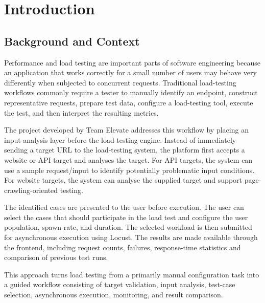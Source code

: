 \documentclass{tietreport}
\author{%
  \texttt{102403671} Yash Bharadwaj \\
  \texttt{1024030672} Nikhil Khosla \\
  \texttt{1024031155} Krish Agrawal%
}
\begin{document}
\maketitle

\tableofcontents


\chapter{Introduction}

\section{Background and Context}

Performance and load testing are important parts of software engineering because an application that works correctly for a small number of users may behave very differently when subjected to concurrent requests. Traditional load-testing workflows commonly require a tester to manually identify an endpoint, construct representative requests, prepare test data, configure a load-testing tool, execute the test, and then interpret the resulting metrics.

The project developed by Team Elevate addresses this workflow by placing an input-analysis layer before the load-testing engine. Instead of immediately sending a target URL to the load-testing system, the platform first accepts a website or API target and analyses the target. For API targets, the system can use a sample request/input to identify potentially problematic input conditions. For website targets, the system can analyse the supplied target and support page-crawling-oriented testing.

The identified cases are presented to the user before execution. The user can select the cases that should participate in the load test and configure the user population, spawn rate, and duration. The selected workload is then submitted for asynchronous execution using Locust. The results are made available through the frontend, including request counts, failures, response-time statistics and comparison of previous test runs.

This approach turns load testing from a primarily manual configuration task into a guided workflow consisting of target validation, input analysis, test-case selection, asynchronous execution, monitoring, and result comparison.
\end{document}
